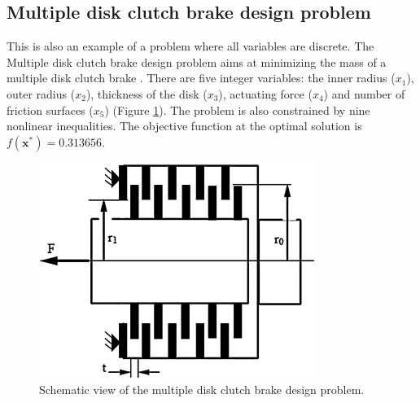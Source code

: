 
\subsection*{Multiple disk clutch brake design problem}

This is also an example of a problem where all variables are discrete. The Multiple disk clutch brake design problem aims at minimizing the mass of a multiple disk clutch brake \cite{MD}. There are five integer variables: the inner radius ($x_1$), outer radius ($x_2$), thickness of the disk ($x_3$), actuating force ($x_4$) and number of friction surfaces ($x_5$) (Figure \ref{fig:MD}). The problem is also constrained by nine nonlinear inequalities. The objective function at the optimal solution is $f(\bm{x}^*) = 0.313656$.

\begin{figure}[h]
    \begin{center}
    \includegraphics[scale=0.6]{Imgs/MD.jpg}
    \end{center}
    \captionsetup{justification=centering}
    \caption{Schematic view of the multiple disk clutch brake design problem.}\label{fig:MD}
\end{figure}


